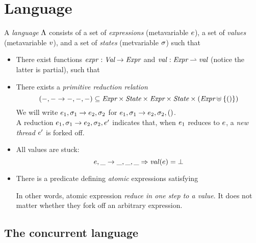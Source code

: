 \section{Language}

A \emph{language} $\Lambda$ consists of a set  of \emph{expressions} (metavariable $e$), a set  of \emph{values} (metavariable $v$), and a set  of \emph{states} (metvariable $\sigma$) such that
\begin{itemize}
\item There exist functions $\mathit{expr} : \textit{Val} \to \textit{Expr}$ and $\mathit{val} : \textit{Expr} \rightharpoonup \textit{val}$ (notice the latter is partial), such that
\item There exists a \emph{primitive reduction relation} \[(-,- \rightarrow -,-,-) \subseteq \textit{Expr} \times \textit{State} \times \textit{Expr} \times \textit{State} \times (\textit{Expr} \uplus \left\{()\right\})\]
  We will write $e_1, \sigma_1 \rightarrow e_2, \sigma_2$ for $e_1, \sigma_1 \rightarrow e_2, \sigma_2, ()$. \\
  A reduction $e_1, \sigma_1 \rightarrow e_2, \sigma_2, e'$ indicates that, when $e_1$ reduces to $e$, a \emph{new thread} $e'$ is forked off.
\item All values are stuck:
\[ e, \_ \rightarrow  \_, \_, \_ \Rightarrow \mathit{val}(e) = \bot \]
\item There is a predicate defining \emph{atomic} expressions satisfying
\let\oldcr\cr
{}
In other words, atomic expression \emph{reduce in one step to a value}.
It does not matter whether they fork off an arbitrary expression.
\end{itemize}

\subsection{The concurrent language}

